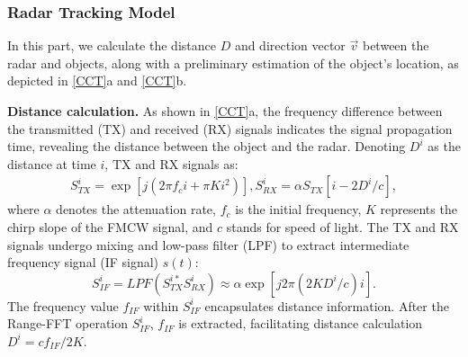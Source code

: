 \subsubsection{\textbf{Radar Tracking Model}} \label{4.1.1}
In this part, we calculate the distance $D$ and direction vector $\vec{v}$ between the radar and objects, along with a preliminary estimation of the object's location, as depicted in \fig \ref{CCT}a and \fig \ref{CCT}b.

\textbf{Distance calculation.} 
As shown in \fig \ref{CCT}a, the frequency difference between the transmitted (TX) and received (RX) signals indicates the signal propagation time, revealing the distance between the object and the radar.
Denoting $D^i$ as the distance at time $i$, TX and RX signals as:
\begin{equation}
\begin{aligned}
S_{TX}^i\!=\!\exp \left[j\left(2 \pi f_c i+\pi K i^2\right)\right], 
S_{RX}^i\!=\!\alpha S_{TX}\left[i-2D^i/{c}\right],
\end{aligned}
\end{equation}
where $\alpha$ denotes the attenuation rate, $f_c$ is the initial frequency, $K$ represents the chirp slope of the FMCW signal, and $c$ stands for speed of light.
The TX and RX signals undergo mixing and low-pass filter (LPF) to extract intermediate frequency signal (IF signal) $s(t)$: 
\begin{equation}
S_{IF}^i=LPF(S_{TX}^{i*} S_{RX}^{i}) \approx \alpha \exp \left[j 2 \pi\left(2KD^i/c\right)i\right].
\end{equation}
The frequency value $f_{IF}$ within $S_{IF}^i$ encapsulates distance information. 
After the Range-FFT operation $S_{IF}^i$, $f_{IF}$ is extracted, facilitating distance calculation $D^i=c f_{IF} / 2K$.


